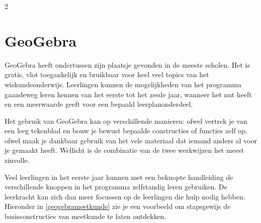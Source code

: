 \begin{multicols}{2}
	\section{GeoGebra}
GeoGebra heeft ondertussen zijn plaatsje gevonden in de meeste scholen. Het is gratis, vlot toegankelijk en bruikbaar voor heel veel topics van het wiskundeonderwijs. Leerlingen kunnen de mogelijkheden van het programma gaandeweg leren kennen van het eerste tot het zesde jaar, wanneer het nut heeft en een meerwaarde geeft voor een bepaald leerplanonderdeel.

Het gebruik van GeoGebra kan op verschillende manieren: ofwel vertrek je van een leeg tekenblad en bouw je bewust bepaalde constructies of functies zelf op, ofwel maak je dankbaar gebruik van het vele materiaal dat iemand anders al voor je gemaakt heeft. Wellicht is de combinatie van de twee werkwijzen het meest zinvolle.

Veel leerlingen in het eerste jaar kunnen met een beknopte handleiding de verschillende knoppen in het programma zelfstandig leren gebruiken. De leerkracht kan zich dan meer focussen op de leerlingen die hulp nodig hebben. Hieronder in \autoref{geogebrameetkunde} zie je een voorbeeld om stapsgewijs de basisconstructies van meetkunde te laten ontdekken.



\end {multicols}


